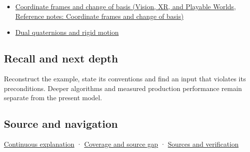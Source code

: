 \begin{itemize}
\tightlist
\item
  \href{../07-Vision-XR-and-Playable-Worlds/main.pdf\#nameddest=appendix-1bae9457dbc3}{Coordinate frames and change of basis (Vision, XR, and Playable Worlds, Reference notes: Coordinate frames and change of basis)}
\item
  \hyperref[appendix-d1ea57347893]{Dual quaternions and rigid motion}
\end{itemize}

\subsection{Recall and next depth}\label{appendix-0bf0ca73f735-recall-and-next-depth}

Reconstruct the example, state its conventions and find an input that violates its preconditions. Deeper algorithms and measured production performance remain separate from the present model.

\subsection{Source and navigation}\label{appendix-0bf0ca73f735-source-and-navigation}

\hyperref[01-foundations-i-ch018-keep-the-promises-visible-while-moving-between-representations]{Continuous explanation} · \hyperref[appendix-fd090d982a15-phase-7---parts-601-700]{Coverage and source gap} · \hyperref[appendix-a103e7846d21-phase-7---source-analysis-and-verification]{Sources and verification}
